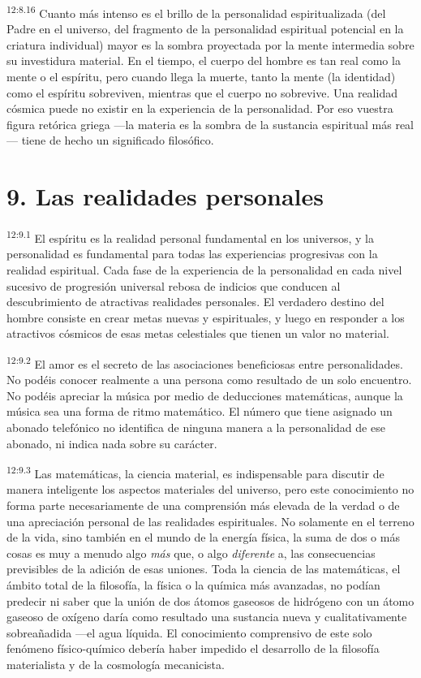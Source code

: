 \par
\textsuperscript{12:8.16} Cuanto más intenso es el brillo de la personalidad espiritualizada (del Padre en el universo, del fragmento de la personalidad espiritual potencial en la criatura individual) mayor es la sombra proyectada por la mente intermedia sobre su investidura material. En el tiempo, el cuerpo del hombre es tan real como la mente o el espíritu, pero cuando llega la muerte, tanto la mente (la identidad) como el espíritu sobreviven, mientras que el cuerpo no sobrevive. Una realidad cósmica puede no existir en la experiencia de la personalidad. Por eso vuestra figura retórica griega ---la materia es la sombra de la sustancia espiritual más real--- tiene de hecho un significado filosófico.

\section*{9. Las realidades personales}
\par
\textsuperscript{12:9.1} El espíritu es la realidad personal fundamental en los universos, y la personalidad es fundamental para todas las experiencias progresivas con la realidad espiritual. Cada fase de la experiencia de la personalidad en cada nivel sucesivo de progresión universal rebosa de indicios que conducen al descubrimiento de atractivas realidades personales. El verdadero destino del hombre consiste en crear metas nuevas y espirituales, y luego en responder a los atractivos cósmicos de esas metas celestiales que tienen un valor no material.

\par
\textsuperscript{12:9.2} El amor es el secreto de las asociaciones beneficiosas entre personalidades. No podéis conocer realmente a una persona como resultado de un solo encuentro. No podéis apreciar la música por medio de deducciones matemáticas, aunque la música sea una forma de ritmo matemático. El número que tiene asignado un abonado telefónico no identifica de ninguna manera a la personalidad de ese abonado, ni indica nada sobre su carácter.

\par
\textsuperscript{12:9.3} Las matemáticas, la ciencia material, es indispensable para discutir de manera inteligente los aspectos materiales del universo, pero este conocimiento no forma parte necesariamente de una comprensión más elevada de la verdad o de una apreciación personal de las realidades espirituales. No solamente en el terreno de la vida, sino también en el mundo de la energía física, la suma de dos o más cosas es muy a menudo algo \textit{más} que, o algo \textit{diferente} a, las consecuencias previsibles de la adición de esas uniones. Toda la ciencia de las matemáticas, el ámbito total de la filosofía, la física o la química más avanzadas, no podían predecir ni saber que la unión de dos átomos gaseosos de hidrógeno con un átomo gaseoso de oxígeno daría como resultado una sustancia nueva y cualitativamente sobreañadida ---el agua líquida. El conocimiento comprensivo de este solo fenómeno físico-químico debería haber impedido el desarrollo de la filosofía materialista y de la cosmología mecanicista.

